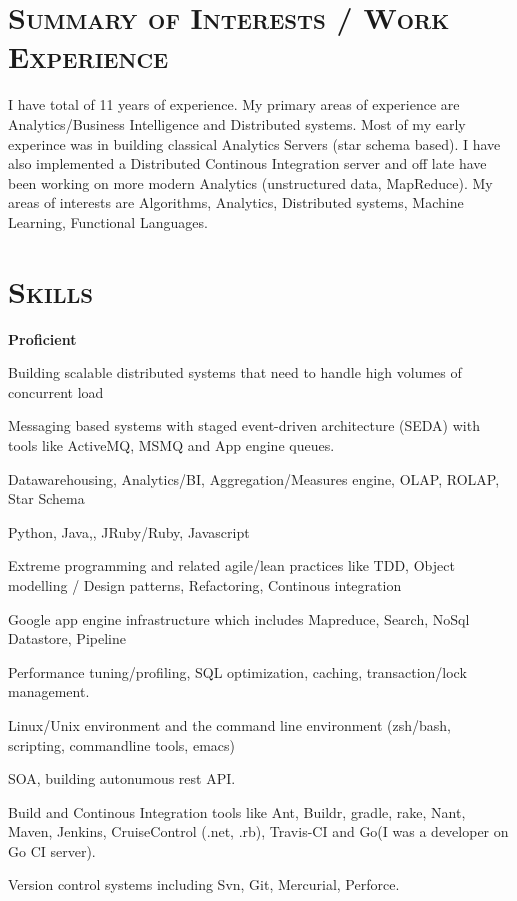 \begin{resume}




\section{\textsc{Summary of Interests / Work Experience}}
I have total of 11 years of experience. My primary areas of experience are Analytics/Business Intelligence and Distributed systems. Most of my early experince was in building classical Analytics Servers (star schema based). I have also implemented a Distributed Continous Integration server and off late have been working on more modern Analytics (unstructured data, MapReduce). My areas of interests are Algorithms, Analytics, Distributed systems, Machine Learning, Functional Languages.

\section{\textsc{Skills}} 
{\textbf{Proficient}}
\begin{mylist}
  \item Building scalable distributed systems that need to handle high volumes of concurrent load
  \item Messaging based systems with staged event-driven architecture (SEDA) with tools like ActiveMQ, MSMQ and App engine queues.
  \item Datawarehousing, Analytics/BI, Aggregation/Measures engine, OLAP, ROLAP, Star Schema
  \item Python, Java,\CSharp, JRuby/Ruby, Javascript
  \item Extreme programming and related agile/lean practices like TDD, Object modelling / Design patterns, Refactoring, Continous integration
  \item Google app engine infrastructure which includes Mapreduce, Search, NoSql Datastore, Pipeline
  \item Performance tuning/profiling, SQL optimization, caching, transaction/lock management.
  \item Linux/Unix environment and the command line environment (zsh/bash, scripting, commandline tools, emacs)
 \item SOA, building autonumous rest API.

  \item Build and Continous Integration tools like Ant, Buildr, gradle, rake, Nant, Maven,  Jenkins, CruiseControl (.net, .rb), Travis-CI and Go(I was a developer on Go CI server).
\item Version control systems including Svn, Git, Mercurial, Perforce.


\end{mylist}
\end{resume}
